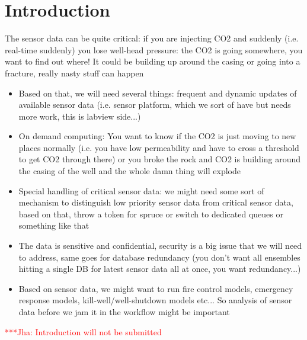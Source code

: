 \documentclass[conference,draft]{IEEEtran}
\newcommand{\jhanote}[1]{ {\textcolor{red} { ***Jha: #1 }}}
\newcommand{\jhanote}[1]{}
\begin{document}
\section{Introduction}

The sensor data can be quite critical: if you are injecting CO2 and suddenly (i.e. real-time suddenly) you lose well-head pressure: the CO2 is going somewhere, you want to find out where! It could be building up around the casing or going into a fracture, really nasty stuff can happen
\begin{itemize}
 \item Based on that, we will need several things: frequent and dynamic updates of available sensor data (i.e. sensor platform, which we sort of have but needs more work, this is labview side...)
 \item On demand computing: You want to know if the CO2 is just moving to new places normally (i.e. you have low permeability and have to cross a threshold to get CO2 through there) or you broke the rock and CO2 is building around the casing of the well and the whole damn thing will explode
 \item Special handling of critical sensor data: we might need some sort of mechanism to distinguish low priority sensor data from critical sensor data, based on that, throw a token for spruce or switch to dedicated queues or something like that
 \item The data is sensitive and confidential, security is a big issue that we will need to address, same goes for database redundancy (you don't want all ensembles hitting a single DB for latest sensor data all at once, you want redundancy...)
\item Based on sensor data, we might want to run fire control models, emergency response models, kill-well/well-shutdown models etc... So analysis of sensor data before we jam it in the workflow might be important
\end{itemize}

\jhanote{Introduction will not be submitted}

 

\end{document}

